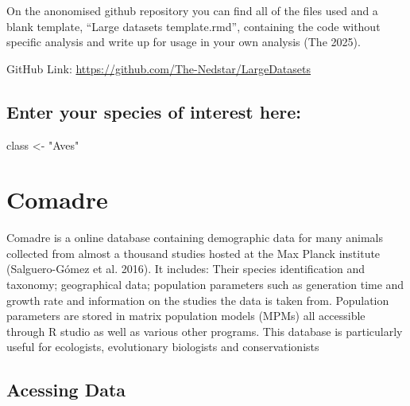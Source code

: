 \documentclass[
]{article}
\newenvironment{Shaded}{\begin{snugshade}}{\end{snugshade}}
\newcommand{\NormalTok}[1]{#1}
\newcommand{\OtherTok}[1]{\textcolor[rgb]{0.56,0.35,0.01}{#1}}
\newcommand{\StringTok}[1]{\textcolor[rgb]{0.31,0.60,0.02}{#1}}
\begin{document}
On the anonomised github repository you can find all of the files used
and a blank template, ``Large datasets template.rmd'', containing the
code without specific analysis and write up for usage in your own
analysis (The 2025).

GitHub Link: \url{https://github.com/The-Nedstar/LargeDatasets}

\subsection{Enter your species of interest
here:}\label{enter-your-species-of-interest-here}

\begin{Shaded}
\begin{Highlighting}[]
\NormalTok{class }\OtherTok{\textless{}{-}} \StringTok{"Aves"}
\end{Highlighting}
\end{Shaded}

\section{Comadre}\label{comadre}

Comadre is a online database containing demographic data for many
animals collected from almost a thousand studies hosted at the Max
Planck institute (Salguero-Gómez et al. 2016). It includes: Their
species identification and taxonomy; geographical data; population
parameters such as generation time and growth rate and information on
the studies the data is taken from. Population parameters are stored in
matrix population models (MPMs) all accessible through R studio as well
as various other programs. This database is particularly useful for
ecologists, evolutionary biologists and conservationists

\subsection{Acessing Data}\label{acessing-data}
\end{document}
